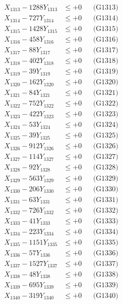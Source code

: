 \documentclass[a4paper,10pt]{article}
\begin{document}
{\begin{align}
X_{1313} - 1288Y_{1313} &\leq +0 && \text{(G1313)} \\
X_{1314} - 727Y_{1314} &\leq +0 && \text{(G1314)} \\
X_{1315} - 1428Y_{1315} &\leq +0 && \text{(G1315)} \\
X_{1316} - 458Y_{1316} &\leq +0 && \text{(G1316)} \\
X_{1317} - 88Y_{1317} &\leq +0 && \text{(G1317)} \\
X_{1318} - 402Y_{1318} &\leq +0 && \text{(G1318)} \\
X_{1319} - 39Y_{1319} &\leq +0 && \text{(G1319)} \\
X_{1320} - 162Y_{1320} &\leq +0 && \text{(G1320)} \\
\allowbreak
X_{1321} - 84Y_{1321} &\leq +0 && \text{(G1321)} \\
X_{1322} - 752Y_{1322} &\leq +0 && \text{(G1322)} \\
X_{1323} - 422Y_{1323} &\leq +0 && \text{(G1323)} \\
X_{1324} - 53Y_{1324} &\leq +0 && \text{(G1324)} \\
X_{1325} - 39Y_{1325} &\leq +0 && \text{(G1325)} \\
X_{1326} - 912Y_{1326} &\leq +0 && \text{(G1326)} \\
X_{1327} - 114Y_{1327} &\leq +0 && \text{(G1327)} \\
X_{1328} - 92Y_{1328} &\leq +0 && \text{(G1328)} \\
X_{1329} - 563Y_{1329} &\leq +0 && \text{(G1329)} \\
X_{1330} - 206Y_{1330} &\leq +0 && \text{(G1330)} \\
\allowbreak
X_{1331} - 63Y_{1331} &\leq +0 && \text{(G1331)} \\
X_{1332} - 726Y_{1332} &\leq +0 && \text{(G1332)} \\
X_{1333} - 41Y_{1333} &\leq +0 && \text{(G1333)} \\
X_{1334} - 223Y_{1334} &\leq +0 && \text{(G1334)} \\
X_{1335} - 1151Y_{1335} &\leq +0 && \text{(G1335)} \\
X_{1336} - 57Y_{1336} &\leq +0 && \text{(G1336)} \\
X_{1337} - 1527Y_{1337} &\leq +0 && \text{(G1337)} \\
X_{1338} - 48Y_{1338} &\leq +0 && \text{(G1338)} \\
X_{1339} - 695Y_{1339} &\leq +0 && \text{(G1339)} \\
X_{1340} - 319Y_{1340} &\leq +0 && \text{(G1340)} \\

\end{align}}
\end{document}
